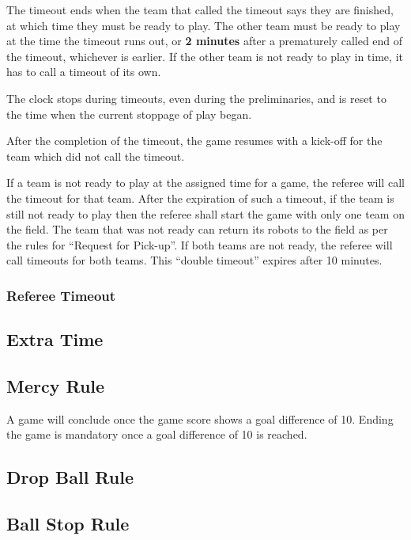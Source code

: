 The timeout ends when the team that called the timeout says they are finished, at which time they must be ready to play.
The other team must be ready to play at the time the timeout runs out, or \textbf{2 minutes} after a prematurely called end of the timeout, whichever is earlier.
If the other team is not ready to play in time, it has to call a timeout of its own.

The clock stops during timeouts, even during the preliminaries, and is reset to the time when the current stoppage of play began.

After the completion of the timeout, the game resumes with a kick-off for the team which did not call the timeout.

If a team is not ready to play at the assigned time for a game, the referee will call the timeout for that team.
After the expiration of such a timeout, if the team is still not ready to play then the referee shall start the game with only one team on the field.
The team that was not ready can return its robots to the field as per the rules for ``Request for Pick-up''.
If both teams are not ready, the referee will call timeouts for both teams.
This ``double timeout'' expires after 10 minutes.

\subsubsection{Referee Timeout}

\subsection{Extra Time}

\subsection{Mercy Rule}
\label{sec:mercy_rule}

A game will conclude once the game score shows a goal difference of 10.
Ending the game is mandatory once a goal difference of 10 is reached.

\subsection{Drop Ball Rule}

\subsection{Ball Stop Rule}

